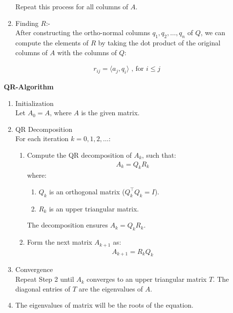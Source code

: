 \documentclass[journal]{IEEEtran}
\numberwithin{equation}{enumi}
\numberwithin{figure}{enumi}
\begin{document}
\begin{enumerate}
\begin{enumerate}
Repeat this process for all columns of \( A \).

\item Finding $R$:- \\
After constructing the ortho-normal columns $ q_1, q_2, \dots, q_n $ of $Q$, we can compute the elements of $R$ by taking the dot product of the original columns of $A$ with the columns of $Q$:

\begin{align}
    r_{ij} = \langle a_j, q_i \rangle \text{ , for  }  i \leq j 
\end{align}
\end{enumerate}



\textbf{QR-Algorithm}\\
\begin{enumerate}
\item Initialization \\
Let $A_0 = A $, where $A$ is the given matrix.

\item QR Decomposition \\
For each iteration $ k = 0, 1, 2, \dots $:
\begin{enumerate}
    \item Compute the QR decomposition of \( A_k \), such that:
    \begin{align}
    A_k = Q_k R_k
    \end{align}
    where:
    \begin{enumerate}
        \item $Q_k $ is an orthogonal matrix ($ Q_k^\top Q_k = I $).
        \item $ R_k $ is an upper triangular matrix.
    \end{enumerate}
    The decomposition ensures $ A_k = Q_k R_k $.

    \item Form the next matrix \( A_{k+1} \) as:
    \begin{align}
    A_{k+1} = R_k Q_k
    \end{align}
\end{enumerate}

\item Convergence\\
Repeat Step 2 until $ A_k $ converges to an upper triangular matrix $ T $. The diagonal entries of $T$ are the eigenvalues of $A$.\\
\item The eigenvalues of matrix will be the roots of the equation.



\end{enumerate}
\end{enumerate}
\end{document}
